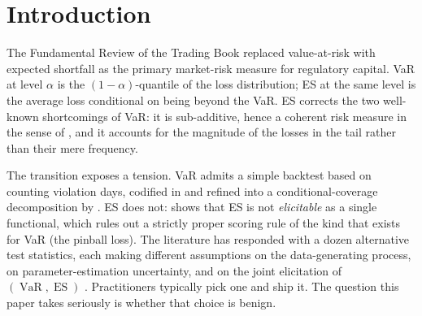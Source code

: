 \documentclass[11pt,a4paper]{article}
\newcommand{\VaR}{\operatorname{VaR}}
\newcommand{\ES}{\operatorname{ES}}
\theoremstyle{plain}
\begin{document}
\tableofcontents
\clearpage
{}
\setcounter{page}{1}

\section{Introduction}
\label{sec:intro}

The Fundamental Review of the Trading Book \citep{bcbs_2019} replaced
value-at-risk with expected shortfall as the primary market-risk
measure for regulatory capital. VaR at level $\alpha$ is the
$(1-\alpha)$-quantile of the loss distribution; ES at the same level
is the average loss conditional on being beyond the VaR. ES corrects
the two well-known shortcomings of VaR: it is sub-additive, hence a
coherent risk measure in the sense of \citet{artzner_etal_1999}, and
it accounts for the magnitude of the losses in the tail rather than
their mere frequency.

The transition exposes a tension. VaR admits a simple backtest based
on counting violation days, codified in \citet{kupiec_1995} and refined
into a conditional-coverage decomposition by \citet{christoffersen_1998}.
ES does not: \citet{gneiting_2011} shows that ES is not
\emph{elicitable} as a single functional, which rules out a strictly
proper scoring rule of the kind that exists for VaR (the pinball
loss). The literature has responded with a dozen alternative test
statistics, each making different assumptions on the data-generating
process, on parameter-estimation uncertainty, and on the joint
elicitation of $(\VaR, \ES)$ \citep{fissler_ziegel_2016,
nolde_ziegel_2017}. Practitioners typically pick one and ship it. The
question this paper takes seriously is whether that choice
is benign.
\end{document}
